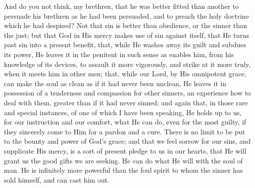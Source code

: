 And do you not think, my brethren, that he was better fitted than
another to persuade his brethren as he had been persuaded, and to
preach the holy doctrine which he had despised? Not that sin is better
than obedience, or the sinner than the just; but that God in His mercy
makes use of sin against itself, that He turns past sin into a present
benefit, that, while He washes away its guilt and subdues its power,
He leaves it in the penitent in such sense as enables him, from his
knowledge of its devices, to assault it more vigorously, and strike at
it more truly, when it meets him in other men; that, while our Lord,
by His omnipotent grace, can make the soul as clean as if it had never
been unclean, He leaves it in possession of a tenderness and
compassion for other sinners, an experience how to deal with them,
greater than if it had never sinned; and again that, in those rare and
special instances, of one of which I have been speaking, He holds up
to us, for our instruction and our comfort, what He can do, even for
the most guilty, if they sincerely come to Him for a pardon and a
cure. There is no limit to be put to the bounty and power of God's
grace; and that we feel sorrow for our sins, and supplicate His mercy,
is a sort of present pledge to us in our hearts, that He will grant us
the good gifts we are seeking. He can do what He will with the soul of
man. He is infinitely more powerful than the foul spirit to whom the
sinner has sold himself, and can cast him out.

